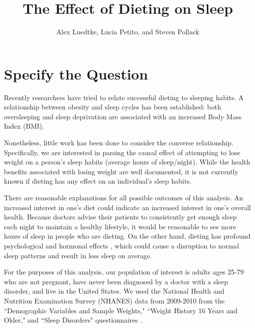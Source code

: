 \documentclass{article}
\begin{document}
%

\newcommand{\E}{\mathbb{E}}
\newcommand{\indp}{\ensuremath{\perp\hspace{-5pt}\perp}}
\newcommand{\M}{\mathcal{M}}
\newcommand{\given}{\; \mid \;}



\title{\textbf{The Effect of Dieting on Sleep}}
\author{Alex Luedtke, Lucia Petito, and Steven Pollack}
\date{}
\maketitle

\section{Specify the Question}

Recently researchers have tried to relate successful dieting to sleeping habits.  A relationship between obesity and sleep cycles has been established: both oversleeping \cite{sgain} and sleep deprivation \cite{sloss} are associated with an increased Body Mass Index (BMI). 

Nonetheless, little work has been done to consider the converse relationship. Specifically, we are interested in parsing the causal effect of attempting to lose weight on a person's sleep habits (average hours of sleep/night). While the health benefits associated with losing weight are well documented, it is not currently known if dieting has any effect on an individual's sleep habits.

There are reasonable explanations for all possible outcomes of this analysis.  An increased interest in one's diet could indicate an increased interest in one's overall health.  Because doctors advise their patients to consistently get enough sleep each night to maintain a healthy lifestyle, it would be reasonable to see more hours of sleep in people who are dieting.  On the other hand, dieting has profound psychological and hormonal effects \cite{hormone}, which could cause a disruption to normal sleep patterns and result in less sleep on average.

For the purposes of this analysis, our population of interest is adults ages 25-79 who are not pregnant, have never been diagnosed by a doctor with a sleep disorder, and live in the United States.  We used the National Health and Nutrition Examination Survey (NHANES) data from 2009-2010 \cite{data} from the ``Demographic Variables and Sample Weights," ``Weight History 16 Years and Older," and ``Sleep Disorders" questionnaires \cite{questionnaire}.
\end{document}
